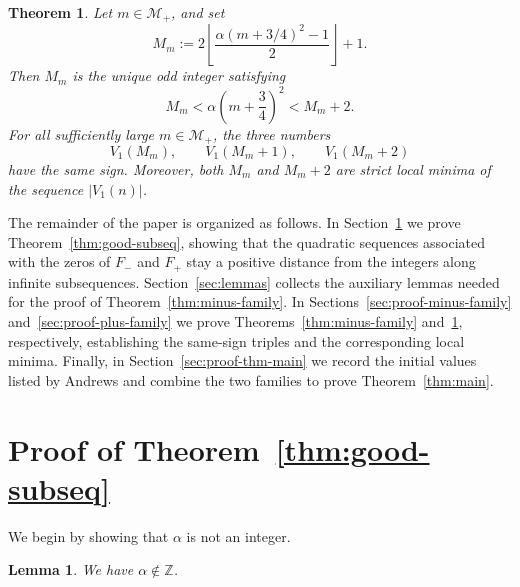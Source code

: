 \documentclass[reqno]{amsart}
\theoremstyle{definition}
\theoremstyle{plain}
\newtheorem{lemma}      {Lemma}
\newtheorem{theorem}    {Theorem}
\theoremstyle{remark}
\numberwithin{equation}{section}
\newcommand{\Z}{\mathbb{Z}}
\begin{document}
\begin{theorem}\label{thm:plus-family}
Let $m\in \mathcal M_+$, and set
\[
  M_m:=2\left\lfloor \frac{\alpha(m+3/4)^2-1}{2}\right\rfloor+1.
\]
Then $M_m$ is the unique odd integer satisfying
\[
  M_m<\alpha\left(m+\frac34\right)^2<M_m+2.
\]
For all sufficiently large $m\in \mathcal M_+$, the three numbers
\[
  V_1(M_m),\qquad V_1(M_m+1),\qquad V_1(M_m+2)
\]
have the same sign. Moreover, both $M_m$ and $M_m+2$ are strict local minima of the sequence $|V_1(n)|$.
\end{theorem}

The remainder of the paper is organized as follows. In Section~\ref{sec:proof-good-subseq} we prove Theorem~\ref{thm:good-subseq}, showing that the quadratic sequences associated with the zeros of $F_-$ and $F_+$ stay a positive distance from the integers along infinite subsequences. Section~\ref{sec:lemmas} collects the auxiliary lemmas needed for the proof of Theorem~\ref{thm:minus-family}. In Sections~\ref{sec:proof-minus-family} and~\ref{sec:proof-plus-family} we prove Theorems~\ref{thm:minus-family} and~\ref{thm:plus-family}, respectively, establishing the same-sign triples and the corresponding local minima. Finally, in Section~\ref{sec:proof-thm-main} we record the initial values listed by Andrews and combine the two families to prove Theorem~\ref{thm:main}.



\section{Proof of Theorem~\ref{thm:good-subseq}}\label{sec:proof-good-subseq}

We begin by showing that $\alpha$ is not an integer.
\begin{lemma}\label{lem:alpha-not-Z}
We have $\alpha\notin \Z$.
\end{lemma}
\end{document}
